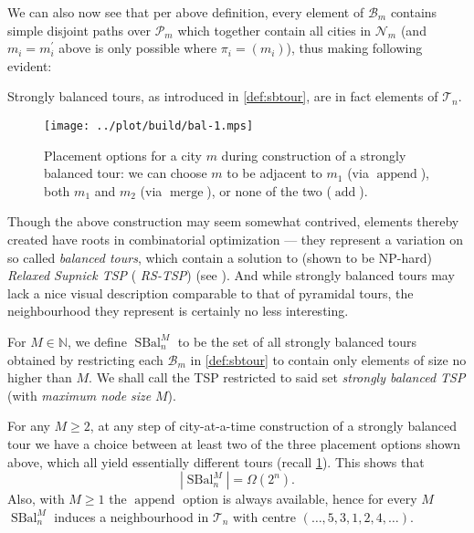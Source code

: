 \documentclass[titlepage,twoside,index=totoc,bibliography=totoc]{scrartcl}
\numberwithin{equation}{section}
\numberwithin{figure}{section}
\numberwithin{table}{section}
\let\defstyle\itshape
\begin{document}
We can also now see that per above definition, every element of
$\mathcal{B}_m$ contains simple disjoint paths over $\mathcal{P}_m$ which
together contain all cities in $\mathcal{N}_m$ (and $m_i = m_i^\prime$ above is
only possible where $\pi_i = (m_i)$), thus making following evident:
\begin{remark}
  Strongly balanced tours, as introduced in \cref{def:sbtour},
  are in fact elements of $\mathcal{T}_n$.
\end{remark}

\begin{figure}[hbt]
  \centering
  \texttt{[image: ../plot/build/bal-1.mps]}
  \caption{%
    Placement options for a city $m$ during construction of a strongly
    balanced tour: we can choose $m$ to be adjacent to $m_1$ (via $\operatorname{append}$),
    both $m_1$ and $m_2$ (via $\operatorname{merge}$), or none of the two ($\operatorname{add}$).
 }
 \label{fig:sbopt}
\end{figure}

Though the above construction may seem somewhat contrived, elements thereby
created have roots in combinatorial optimization --- they represent a
variation on so called {\defstyle balanced tours}, which contain a solution
to (shown to be NP-hard) {\defstyle Relaxed Supnick TSP} ({\defstyle
  RS-TSP}) (see \cite{fpclass,fpneighb}).
And while strongly balanced tours may lack a nice visual description
comparable to that of pyramidal tours, the neighbourhood they represent is
certainly no less interesting.

\begin{define}
For $M \in \mathbb{N}$, we define $\operatorname{SBal}_n^M$ to be the set of all
strongly balanced tours obtained by restricting each $\mathcal{B}_m$ in \cref{def:sbtour}
to contain only elements of size no higher than $M$.
We shall call the TSP restricted to said set
{\defstyle strongly balanced TSP} (with {\defstyle maximum node size} $M$).
\end{define}

\begin{remark}
  For any $M \geq 2$, at any step of city-at-a-time construction of a
  strongly balanced tour we have a choice between at least two of the three
  placement options shown above, %
  which all yield essentially different tours (recall \cref{fig:sbopt}).  This shows that
  \[
    \left|\operatorname{SBal}_n^M\right| = \Omega\left(2^n\right).
  \]
  Also, with $M \geq 1$ the $\operatorname{append}$ option is always available,
  hence for every $M$ $\operatorname{SBal}_n^M$ induces a neighbourhood
  in $\mathcal{T}_n$ with centre $\left(\ldots,5,3,1,2,4,\ldots\right)$.
\end{remark}
\end{document}
